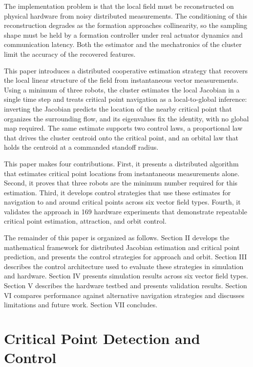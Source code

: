 \documentclass[lettersize,journal]{IEEEtran}
\begin{document}
The implementation problem is that the local field must be reconstructed on physical hardware from noisy distributed measurements. The conditioning of this reconstruction degrades as the formation approaches collinearity, so the sampling shape must be held by a formation controller under real actuator dynamics and communication latency. Both the estimator and the mechatronics of the cluster limit the accuracy of the recovered features.

This paper introduces a distributed cooperative estimation strategy that recovers the local linear structure of the field from instantaneous vector measurements. Using a minimum of three robots, the cluster estimates the local Jacobian in a single time step and treats critical point navigation as a local-to-global inference: inverting the Jacobian predicts the location of the nearby critical point that organizes the surrounding flow, and its eigenvalues fix the identity, with no global map required. The same estimate supports two control laws, a proportional law that drives the cluster centroid onto the critical point, and an orbital law that holds the centroid at a commanded standoff radius.

This paper makes four contributions. First, it presents a distributed algorithm that estimates critical point locations from instantaneous measurements alone. Second, it proves that three robots are the minimum number required for this estimation. Third, it develops control strategies that use these estimates for navigation to and around critical points across six vector field types. Fourth, it validates the approach in 169 hardware experiments that demonstrate repeatable critical point estimation, attraction, and orbit control.

The remainder of this paper is organized as follows. Section II develops the mathematical framework for distributed Jacobian estimation and critical point prediction, and presents the control strategies for approach and orbit. Section III describes the control architecture used to evaluate these strategies in simulation and hardware. Section IV presents simulation results across six vector field types. Section V describes the hardware testbed and presents validation results. Section VI compares performance against alternative navigation strategies and discusses limitations and future work. Section VII concludes.

\section{Critical Point Detection and Control}
\end{document}
